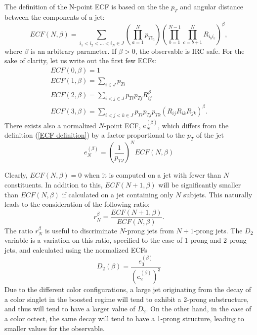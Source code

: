 \documentclass[10pt,a4paper]{book}
\begin{document}
The definition of the N-point ECF is based on the  the $p_T$ and angular distance between the components of a jet:
\begin{equation}
ECF(N,\beta) = \sum_{i_1 < i_2 < \dots < i_N \in J} \left( \prod_{a = 1}^N p_{Ti_a} \right) \left(\prod_{b = 1}^{N-1} \prod_{c = b + 1}^N  R_{i_b i_c}\right)^\beta,
\label{ECF definition}
\end{equation}
where $\beta$ is an arbitrary parameter. If $\beta > 0$, the observable is IRC safe. 
For the sake of clarity, let us write out the first few ECFs:
\begin{gather*}
ECF(0, \beta) = 1\\
ECF(1, \beta) = \sum_{i\in J}p_{Ti} \\
ECF(2, \beta) = \sum_{i < j \in J} p_{Ti}p_{Tj} R_{ij}^\beta \\
ECF(3, \beta) = \sum_{i < j < k \in J} p_{Ti}p_{Tj}p_{Tk} \left(R_{ij}R_{ik}R_{jk}\right)^\beta.
\end{gather*}
There exists also a normalized $N$-point ECF, $e^{(\beta)}_N$, which differs from the definition (\ref{ECF definition}) by a factor proportional to the $p_T$ of the jet
\begin{equation}
e^{(\beta)}_N = \left(\frac{1}{p_{TJ}}\right)^N ECF(N,\beta)
\end{equation}

Clearly, $ECF(N,\beta) = 0$ when it is computed on a jet with fewer than $N$ constituents. In addition to this, $ECF(N+1, \beta)$ will be significantly smaller than $ECF(N,\beta)$ if calculated on a jet containing only $N$ subjets. This naturally leads to the consideration of the following ratio:
\begin{equation}
r_N^\beta = \frac{ECF(N+1,\beta)}{ECF(N,\beta)}.
\end{equation}
The ratio $r_N^\beta$ is useful to discriminate $N$-prong jets from $N+1$-prong jets. The $D_2$ variable \cite{Larkoski:2014gra} is a variation on this ratio, specified to the case of 1-prong and 2-prong jets, and calculated using the normalized ECFs
\begin{equation}
D_2(\beta) = \frac{e^{(\beta)}_3}{(e^{(\beta)}_2)^3}
\end{equation}
Due to the different color configurations, a large jet originating from the decay of a color singlet in the boosted regime will tend to exhibit a 2-prong substructure, and thus will tend to have a larger value of $D_2$. On the other hand, in the case of a color octect, the same decay will tend to have a 1-prong structure, leading to smaller values for the observable.
\end{document}
